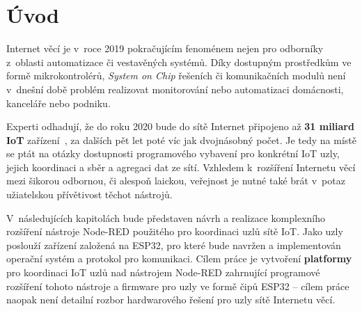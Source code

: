 \chapter{Úvod}
\label{ch:uvod}

Internet věcí je v~roce 2019 pokračujícím fenoménem nejen pro odborníky z~oblasti automatizace či vestavěných systémů.
Díky dostupným prostředkům ve formě mikrokontrolérů, \textit{System on Chip} řešeních či komunikačních modulů není
v~dnešní době problém realizovat monitorování nebo automatizaci domácnosti, kanceláře nebo podniku.

Experti odhadují, že do roku 2020 bude do sítě Internet připojeno až \textbf{31 miliard IoT}
zařízení~\cite{StatistaIoT, IoTTrends}, za dalších pět let poté víc jak dvojnásobný počet.
Je tedy na místě se ptát na otázky dostupnosti programového vybavení pro konkrétní IoT uzly, jejich koordinaci a sběr
a agregaci dat ze sítí.
Vzhledem k~rozšíření Internetu věcí mezi šikorou odbornou, či alespoň laickou, veřejnost je nutné také brát v~potaz
užiatelskou přívětivost těchot nástrojů.

V~následujících kapitolách bude představen návrh a realizace komplexního rozšíření nástroje Node-RED použitého pro
koordinaci uzlů sítě IoT. Jako uzly poslouží zařízení založená na ESP32, pro které bude navržen a implementován
operační systém a protokol pro komunikaci.
Cílem práce je vytvoření \textbf{platformy} pro koordinaci IoT uzlů nad nástrojem Node-RED zahrnující
programové rozšíření tohoto nástroje a firmware pro uzly ve formě čipů ESP32 -- cílem práce naopak není
detailní rozbor hardwarového řešení pro uzly sítě Internetu věcí.

